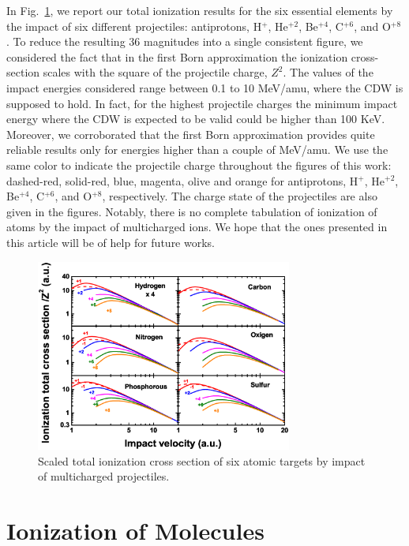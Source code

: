 \documentclass[preprint,12pt]{article}
\begin{document}
In Fig.~\ref{fig:atomscaling}, we report our total ionization results 
for the six essential elements by the impact of six different projectiles: 
antiprotons, H$^{+}$, He$^{+2}$, Be$^{+4}$, C$^{+6}$, and O$^{+8}$. 
To reduce the resulting 36 magnitudes into a single consistent 
figure, we considered the fact that in the first Born approximation
the ionization cross-section scales with the square of the projectile 
charge, $Z^{2}$. The values of the impact energies considered 
range between 0.1 to 10 MeV/amu, where the CDW is supposed 
to hold. In fact, for the highest projectile charges the minimum 
impact energy where the CDW is expected to be valid could be 
higher than 100 KeV. Moreover, we corroborated that the first Born 
approximation provides quite reliable results only for energies higher 
than a couple of MeV/amu. We use the same color to indicate the 
projectile charge throughout the figures of this work: dashed-red, 
solid-red, blue, magenta, olive and orange for antiprotons, 
H$^{+}$, He$^{+2}$, Be$^{+4}$, C$^{+6}$, and O$^{+8}$, respectively. 
The charge state of the projectiles are also given in the figures.
Notably, there is no complete tabulation of ionization of atoms by 
the impact of multicharged ions. We hope that the ones presented 
in this article will be of help for future works.

\begin{figure}[t!]
\centering
\includegraphics[width=0.75\textwidth]{figuras/Fig_finales/Fig1.eps}
\caption{Scaled total ionization cross section of six atomic targets 
by impact of multicharged projectiles.}
\label{fig:atomscaling}
\end{figure} 

\section{Ionization of Molecules}
\end{document}
